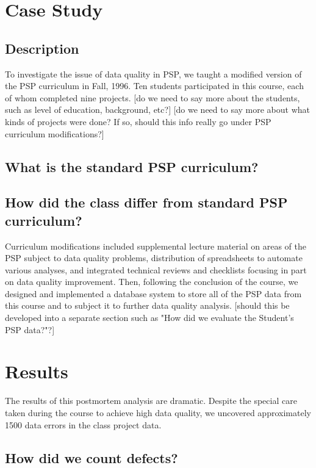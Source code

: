 \chapter{Case Study}
\section{Description}

To investigate the issue of data quality in PSP, we taught a modified
version of the PSP curriculum in Fall, 1996.  Ten students participated
in this course, each of whom completed nine projects.
[do we need to say more about the students, such as level of education,
background, etc?] [do we need to say more about what kinds of projects
were done?  If so, should this info really go under PSP curriculum
modifications?]

\section{What is the standard PSP curriculum?}
\section{How did the class differ from standard PSP curriculum?}

Curriculum modifications included supplemental lecture material on
areas of the PSP subject to data quality problems, distribution of
spreadsheets to automate various analyses, and integrated technical
reviews and checklists focusing in part on data quality improvement.
Then, following the conclusion of the course, we designed and
implemented a database system to store all of the PSP data from this
course and to subject it to further data quality analysis. [should this
be developed into a separate section such as "How did we evaluate the
Student's PSP data?"?]

\chapter{Results}

The results of this postmortem analysis are dramatic.  Despite the
special care taken during the course to achieve high data quality,
we uncovered approximately 1500 data errors in the class project data.

\section{How did we count defects?}

